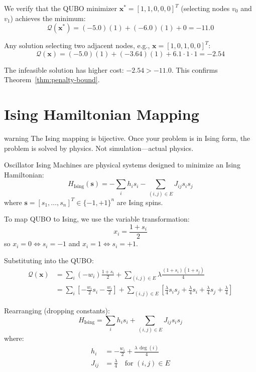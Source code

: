 We verify that the QUBO minimizer $\mathbf{x}^* = [1, 1, 0, 0, 0]^T$ (selecting nodes $v_0$ and $v_1$) achieves the minimum:
\[
\mathcal{Q}(\mathbf{x}^*) = (-5.0)(1) + (-6.0)(1) + 0 = -11.0
\]

Any solution selecting two adjacent nodes, e.g., $\mathbf{x} = [1, 0, 1, 0, 0]^T$:
\[
\mathcal{Q}(\mathbf{x}) = (-5.0)(1) + (-3.64)(1) + 6.1 \cdot 1 \cdot 1 = -2.54
\]

The infeasible solution has higher cost: $-2.54 > -11.0$. This confirms Theorem~\ref{thm:penalty-bound}.

\section{Ising Hamiltonian Mapping}
\begin{block}{warning}
The Ising mapping is bijective. Once your problem is in Ising form, the problem is solved by physics. Not simulation—actual physics.
\end{block}

\label{sec:ising-mapping}

Oscillator Ising Machines are physical systems designed to minimize an Ising Hamiltonian:
\[
H_{\text{Ising}}(\mathbf{s}) = -\sum_i h_i s_i - \sum_{(i,j) \in E} J_{ij} s_i s_j
\]
where $\mathbf{s} = [s_1, \ldots, s_n]^T \in \{-1, +1\}^n$ are Ising spins.

To map QUBO to Ising, we use the variable transformation:
\[
x_i = \frac{1 + s_i}{2}
\]
so $x_i = 0 \Leftrightarrow s_i = -1$ and $x_i = 1 \Leftrightarrow s_i = +1$.

Substituting into the QUBO:
\begin{align}
\mathcal{Q}(\mathbf{x}) &= \sum_i (-w_i) \frac{1+s_i}{2} + \sum_{(i,j)\in E} \lambda \frac{(1+s_i)(1+s_j)}{4} \\
&= \sum_i \left[-\frac{w_i}{2} s_i - \frac{w_i}{2}\right] + \sum_{(i,j)\in E} \left[\frac{\lambda}{4} s_i s_j + \frac{\lambda}{4} s_i + \frac{\lambda}{4} s_j + \frac{\lambda}{4}\right]
\end{align}

Rearranging (dropping constants):
\[
H_{\text{Ising}} = \sum_i h_i s_i + \sum_{(i,j)\in E} J_{ij} s_i s_j
\]
where:
\begin{align}
h_i &= -\frac{w_i}{2} + \frac{\lambda \, \deg(i)}{4} \\
J_{ij} &= \frac{\lambda}{4} \quad \text{for } (i,j) \in E
\end{align}

